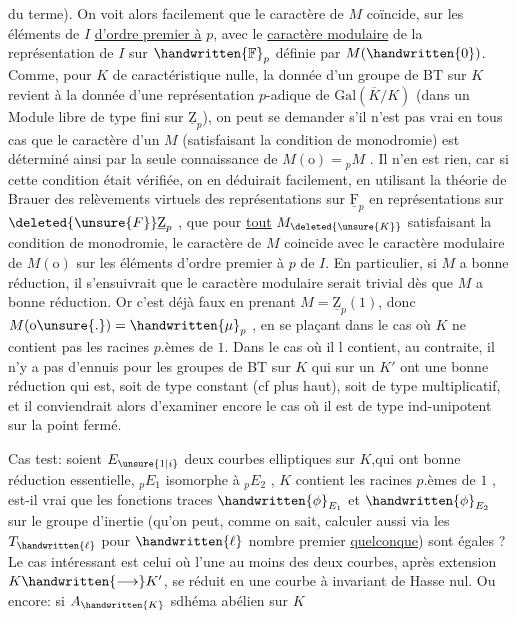 du terme). On voit alors facilement que le caractère de $M$ coïncide, sur les éléments de $I$ \uline{d'ordre premier à} $p$, avec le \uline{caractère modulaire} de la représentation de $I$  sur $\handwritten{\mathbb F}_p$ définie par $M(\handwritten{0})$. Comme, pour $K$ de caractéristique nulle, la donnée d'un groupe de BT sur $K$ revient à la donnée d'une représentation $p$-adique de $\mathrm{Gal}(\overline K/K)$ (dans un Module libre de type fini sur $\underline{\mathrm Z}_p$), on peut se demander  s'il n'est pas vrai en tous cas que le caractère d'un $M$ (satisfaisant la condition de monodromie) est déterminé ainsi par la seule connaissance de $M(\mathrm o)={}_pM$ . Il n'en est rien, car si cette condition était vérifiée, on en déduirait facilement, en utilisant la théorie de Brauer des relèvements virtuels des représentations sur $\underline{\mathrm F}_p$ en représentations sur $\deleted{\unsure{F}}\underline{\mathrm Z}_p$ , que pour \uline{tout} $M_{\deleted{\unsure{K}}}$ satisfaisant la condition de monodromie, le caractère de $M$ coincide avec le caractère modulaire de $M(\mathrm o)$ sur les éléments d'ordre premier à $p$ de $I$. En particulier, si $M$ a bonne réduction, il s'ensuivrait que le caractère modulaire  serait trivial dès que $M$ a bonne réduction. Or c'est déjà faux en prenant $M=\underline{\mathrm Z}_p(1)$, donc $M(\mathrm o\unsure{.})=\handwritten{\mu}_p$ ,  en se plaçant dans le cas où $K$ ne contient pas les racines $p$.èmes de $1$. Dans le cas où il l contient, au contraite, il n'y a pas d'ennuis pour les groupes de BT sur $K$ qui sur un $K'$ ont une bonne réduction qui est, soit de type constant (cf plus haut), soit de type multiplicatif, et il conviendrait alors d'examiner encore le cas où il est de type ind-unipotent sur la  point fermé.


Cas test: soient $E_{\unsure{1|i}}$ deux courbes elliptiques sur $K$,qui ont bonne réduction essentielle, $ {}_pE_1$ isomorphe à $ {}_pE_2$ , $K$ contient les racines $p$.èmes de $1$ , est-il vrai que les fonctions traces $\handwritten{\phi}_{E_1}$ et $\handwritten{\phi}_{E_2}$ sur le groupe d'inertie (qu'on peut, comme on sait, calculer aussi via les $T_{\handwritten{\ell}}$ pour $\handwritten{\ell}$ nombre premier \uline{quelconque}) sont égales  ? Le  cas intéressant est celui où l'une au moins des deux courbes, après extension $K\handwritten{\longrightarrow}K'$, se réduit en une courbe à invariant de Hasse nul. Ou encore: si $A_{\handwritten{K}}$ sdhéma abélien sur $K$

